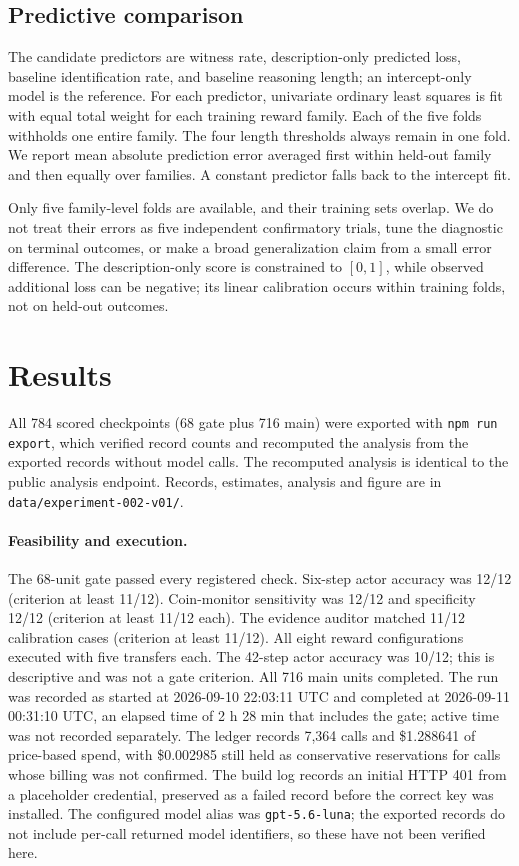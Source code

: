 \documentclass[11pt]{article}
\begin{document}
\subsection{Predictive comparison}
The candidate predictors are witness rate, description-only predicted loss, baseline identification rate, and baseline reasoning length; an intercept-only model is the reference. For each predictor, univariate ordinary least squares is fit with equal total weight for each training reward family. Each of the five folds withholds one entire family. The four length thresholds always remain in one fold. We report mean absolute prediction error averaged first within held-out family and then equally over families. A constant predictor falls back to the intercept fit.

Only five family-level folds are available, and their training sets overlap. We do not treat their errors as five independent confirmatory trials, tune the diagnostic on terminal outcomes, or make a broad generalization claim from a small error difference. The description-only score is constrained to $[0,1]$, while observed additional loss can be negative; its linear calibration occurs within training folds, not on held-out outcomes.

\section{Results}
All 784 scored checkpoints (68 gate plus 716 main) were exported with \texttt{npm run export}, which verified record counts and recomputed the analysis from the exported records without model calls. The recomputed analysis is identical to the public analysis endpoint. Records, estimates, analysis and figure are in \texttt{data/experiment-002-v01/}.

\paragraph{Feasibility and execution.} The 68-unit gate passed every registered check. Six-step actor accuracy was 12/12 (criterion at least 11/12). Coin-monitor sensitivity was 12/12 and specificity 12/12 (criterion at least 11/12 each). The evidence auditor matched 11/12 calibration cases (criterion at least 11/12). All eight reward configurations executed with five transfers each. The 42-step actor accuracy was 10/12; this is descriptive and was not a gate criterion. All 716 main units completed. The run was recorded as started at 2026-09-10 22:03:11 UTC and completed at 2026-09-11 00:31:10 UTC, an elapsed time of 2 h 28 min that includes the gate; active time was not recorded separately. The ledger records 7,364 calls and \$1.288641 of price-based spend, with \$0.002985 still held as conservative reservations for calls whose billing was not confirmed. The build log records an initial HTTP 401 from a placeholder credential, preserved as a failed record before the correct key was installed. The configured model alias was \texttt{gpt-5.6-luna}; the exported records do not include per-call returned model identifiers, so these have not been verified here.
\end{document}
